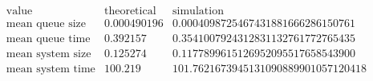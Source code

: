 \[\begin{array}{cccc}
 \text{value} & \text{theoretical} & \text{simulation} & \text{} \\
 \text{mean queue size} & 0.000490196 & 0.0004098725467431881666286150761 & \text{} \\
 \text{mean queue time} & 0.392157 & 0.3541007924312831132761772765435 & \text{} \\
 \text{mean system size} & 0.125274 & 0.1177899615126952095517658543900 & \text{} \\
 \text{mean system time} & 100.219 & 101.7621673945131090889901057120418 & \text{} \\
\end{array}\]

